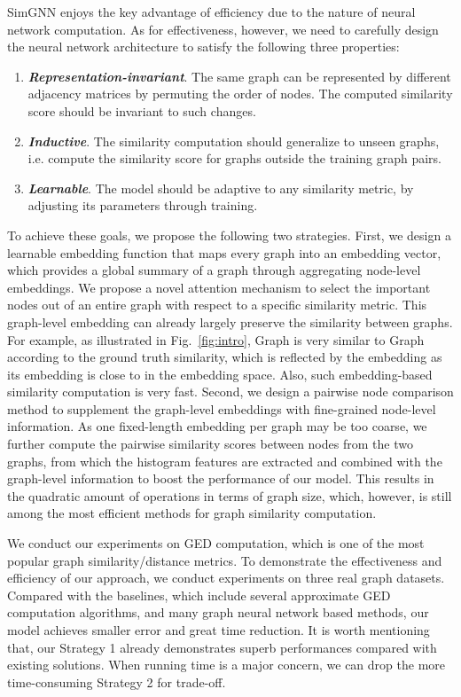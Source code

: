 \documentclass[sigconf]{acmart}
\begin{document}
SimGNN enjoys the key advantage of efficiency due to the nature of neural network computation. As for effectiveness, however, we need to carefully design the neural network architecture to satisfy the following three properties:
\begin{enumerate}\item\textit{\textbf{Representation-invariant}}. The same graph can be represented by different adjacency matrices by permuting the order of nodes. The computed similarity score should be invariant to such changes. \item\textit{\textbf{Inductive}}. The similarity computation should generalize to unseen graphs, i.e. compute the similarity score for graphs outside the training graph pairs. \item \textit{\textbf{Learnable}}. The model should be adaptive to any similarity metric, by adjusting its parameters through training. 
\end{enumerate}
To achieve these goals, we propose the following two strategies. First, we design a learnable embedding function that maps every graph into an embedding vector, which provides a global summary of a graph through aggregating node-level embeddings. We propose a novel attention mechanism to select the important nodes out of an entire graph with respect to a specific similarity metric. This graph-level embedding can already largely preserve the similarity between graphs. For example, as illustrated in Fig.~\ref{fig:intro}, Graph  is very similar to Graph  according to the ground truth similarity, which is reflected by the embedding as its embedding is close to  in the embedding space. Also, such embedding-based similarity computation is very fast. Second, we design a pairwise node comparison method to supplement the graph-level embeddings with fine-grained node-level information. As one fixed-length embedding per graph may be too coarse, we further compute the pairwise similarity scores between nodes from the two graphs, from which the histogram features are extracted and combined with the graph-level information to boost the performance of our model. This results in the quadratic amount of operations in terms of graph size, which, however,  is still among the most efficient methods for graph similarity computation.

We conduct our experiments on GED computation, which is one of the most popular graph similarity/distance metrics. To demonstrate the effectiveness and efficiency of our approach, we conduct experiments on three real graph datasets. Compared with the baselines, which include several approximate GED computation algorithms, and many graph neural network based methods, our model achieves smaller error and great time reduction. It is worth mentioning that, our Strategy 1 already demonstrates superb performances compared with existing solutions. When running time is a major concern, we can drop the more time-consuming Strategy 2 for trade-off.
\end{document}
